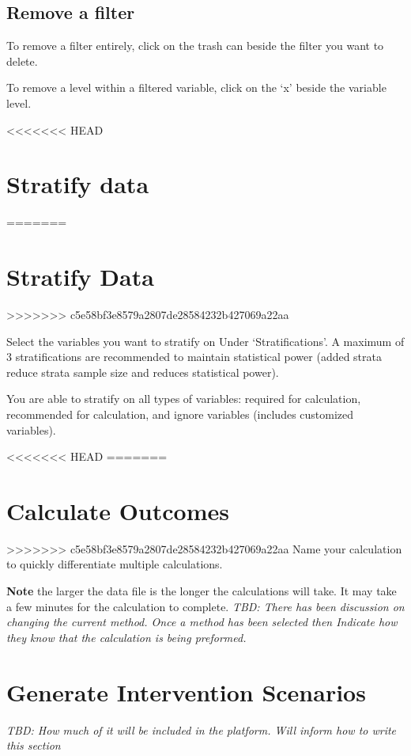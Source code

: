 \documentclass[]{book}
\begin{document}
\subsection{Remove a filter}\label{remove-a-filter}

To remove a filter entirely, click on the trash can beside the filter
you want to delete.

To remove a level within a filtered variable, click on the `x' beside
the variable level.

<<<<<<< HEAD
\section{Stratify data}\label{stratify-data}
=======
\section{Stratify Data}\label{stratify-data}
>>>>>>> c5e58bf3e8579a2807de28584232b427069a22aa

Select the variables you want to stratify on Under `Stratifications'. A
maximum of 3 stratifications are recommended to maintain statistical
power (added strata reduce strata sample size and reduces statistical
power).

You are able to stratify on all types of variables: required for
calculation, recommended for calculation, and ignore variables (includes
customized variables).

<<<<<<< HEAD
=======
\section{Calculate Outcomes}\label{calculate-outcomes}

>>>>>>> c5e58bf3e8579a2807de28584232b427069a22aa
Name your calculation to quickly differentiate multiple calculations.

\textbf{Note} the larger the data file is the longer the calculations
will take. It may take a few minutes for the calculation to complete.
\emph{TBD: There has been discussion on changing the current method.
Once a method has been selected then Indicate how they know that the
calculation is being preformed.}

\section{Generate Intervention
Scenarios}\label{generate-intervention-scenarios}

\emph{TBD: How much of it will be included in the platform. Will inform
how to write this section}
\end{document}
